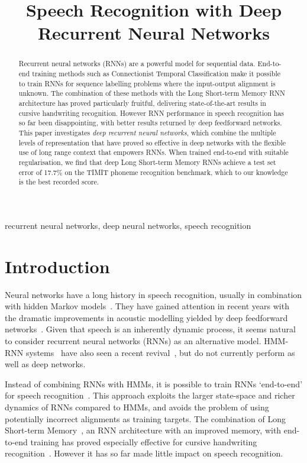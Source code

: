 \documentclass{article}
\title{Speech Recognition with Deep Recurrent Neural Networks}
\begin{document}
\maketitle

\begin{abstract}
Recurrent neural networks (RNNs) are a powerful model for sequential data.
End-to-end training methods such as Connectionist Temporal Classification make it possible to train RNNs for sequence labelling problems where the input-output alignment is unknown.
The combination of these methods with the Long Short-term Memory RNN architecture has proved particularly fruitful, delivering state-of-the-art results in cursive handwriting recognition.
However RNN performance in speech recognition has so far been disappointing, with better results returned by deep feedforward networks.
This paper investigates \emph{deep recurrent neural networks}, which combine the multiple levels of representation that have proved so effective in deep networks with the flexible use of long range context that empowers RNNs. 
When trained end-to-end with suitable regularisation, we find that deep Long Short-term Memory RNNs achieve a test set error of 17.7\% on the TIMIT phoneme recognition benchmark, which to our knowledge is the best recorded score.
\end{abstract}
\begin{keywords}
recurrent neural networks, deep neural networks, speech recognition
\end{keywords}
\section{Introduction}
\label{sec:intro}
Neural networks have a long history in speech recognition, usually in combination with hidden Markov models~\cite{bourlard94hybrid,Zhu04tandem}.
They have gained attention in recent years with the dramatic improvements in acoustic modelling yielded by deep feedforward networks~\cite{5704567,6296526}.
Given that speech is an inherently dynamic process, it seems natural to consider recurrent neural networks (RNNs) as an alternative model.
HMM-RNN systems~\cite{robinson:1994} have also seen a recent revival~\cite{VinyalsICASSP12,maas2012denoisernn}, but do not currently perform as well as deep networks.

Instead of combining RNNs with HMMs, it is possible to train RNNs `end-to-end' for speech recognition~\cite{graves06icml,graves12supervised,graves12transducer}.
This approach exploits the larger state-space and richer dynamics of RNNs compared to HMMs, and avoids the problem of using potentially incorrect alignments as training targets.
The combination of Long Short-term Memory~\cite{hochreiter97lstm}, an RNN architecture with an improved memory, with end-to-end training has proved especially effective for cursive handwriting recognition~\cite{graves08nips,graves09nips}.
However it has so far made little impact on speech recognition.
\end{document}

